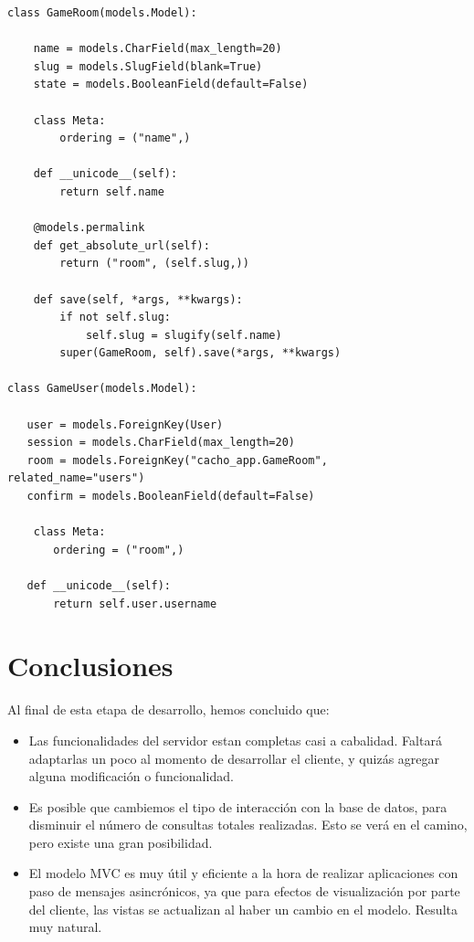 \documentclass[a4paper,11pt]{article}
\begin{document}
\begin{lstlisting}[caption=cacho\_app/models.py]
class GameRoom(models.Model):

    name = models.CharField(max_length=20)
    slug = models.SlugField(blank=True)
    state = models.BooleanField(default=False) 

    class Meta:
        ordering = ("name",)

    def __unicode__(self):
        return self.name

    @models.permalink
    def get_absolute_url(self):
        return ("room", (self.slug,))

    def save(self, *args, **kwargs):
        if not self.slug:
            self.slug = slugify(self.name)
        super(GameRoom, self).save(*args, **kwargs)

class GameUser(models.Model):

   user = models.ForeignKey(User)
   session = models.CharField(max_length=20)
   room = models.ForeignKey("cacho_app.GameRoom", related_name="users")
   confirm = models.BooleanField(default=False)

	class Meta:
       ordering = ("room",)
   
   def __unicode__(self):
       return self.user.username

\end{lstlisting}

\newpage

\section{Conclusiones}

	Al final de esta etapa de desarrollo, hemos concluido que:

\begin{itemize}
	\item Las funcionalidades del servidor estan completas casi a cabalidad.
	Faltará adaptarlas un poco al momento de desarrollar el cliente, y
	quizás agregar alguna modificación o funcionalidad.
	\item Es posible que cambiemos el tipo de interacción con la base de
	datos, para disminuir el número de consultas totales realizadas.
	Esto se verá en el camino, pero existe una gran posibilidad.
	\item El modelo MVC es muy útil y eficiente a la hora de realizar
	aplicaciones con paso de mensajes asincrónicos, ya que para efectos
	de visualización por parte del cliente, las vistas se actualizan 
	al haber un cambio en el modelo. Resulta muy natural.

\end{itemize}
\end{document}
